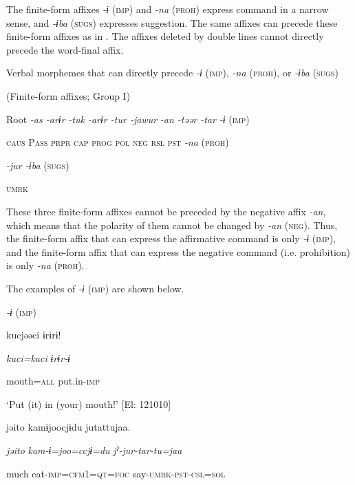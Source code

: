 The finite-form affixes \textit{{}-ɨ} (\textsc{imp}) and \textit{{}-na} (\textsc{proh}) express command in a narrow sense, and \textit{{}-ɨba} (\textsc{sugs}) expresses suggestion. The same affixes can precede these finite-form affixes as in . The affixes deleted by double lines cannot directly precede the word-final affix.

\ea\label{ex:8-69}
  Verbal morphemes that can directly precede \textit{-ɨ} (\textsc{imp}), \textit{{}-na} (\textsc{proh}), or \textit{{}-ɨba} (\textsc{sugs})

(Finite-form affixes; Group I)

  Root  \textit{{}-as  {}-arɨr} %
\textit{{}-tuk  {}-arɨr  {}-tur  {}-jawur} %
\textit{{}-an  {}-təər  {}-tar} %
\textit{{}-ɨ} (\textsc{imp})

    \textsc{caus}  P\textsc{ass}  \textsc{prpr}  \textsc{cap}  \textsc{prog}  \textsc{pol}  \textsc{neg}  \textsc{rsl}  \textsc{pst}    \textit{{}-na} (\textsc{proh})

          \textit{{}-jur      {}-ɨba} (\textsc{sugs})

          \textsc{umrk}

These three finite-form affixes cannot be preceded by the negative affix \textit{{}-an}, which means that the polarity of them cannot be changed by \textit{{}-an} (\textsc{neg}). Thus, the finite-form affix that can express the affirmative command is only \textit{{}-ɨ} (\textsc{imp}), and the finite-form affix that can express the negative command (i.e. prohibition) is only \textit{{}-na} (\textsc{proh}).

  The examples of \textit{{}-ɨ} (\textsc{imp}) are shown below.

\ea\label{ex:8-70}
  \textit{{}-ɨ} (\textsc{imp})

\ea {\TM}
\glll  kucjəəci  ɨrɨrɨ!

      \textit{kuci=kaci}  \textit{ɨrɨr-ɨ}

      mouth=\textsc{all}  put.in-\textsc{imp}

\glt ‘Put (it) in (your) mouth!’ [El: 121010]

\ex {\TM}
\glll  jəito  kamɨjoocjɨdu  jutattujaa.

      \textit{jəito}  \textit{kam-ɨ=joo=ccjɨ=du}  \textit{jˀ-jur-tar-tu=jaa}

      much  eat-\textsc{imp}=\textsc{cfm1}=\textsc{qt}=\textsc{foc}  say-\textsc{umrk}-\textsc{pst}-\textsc{csl}=\textsc{sol}

